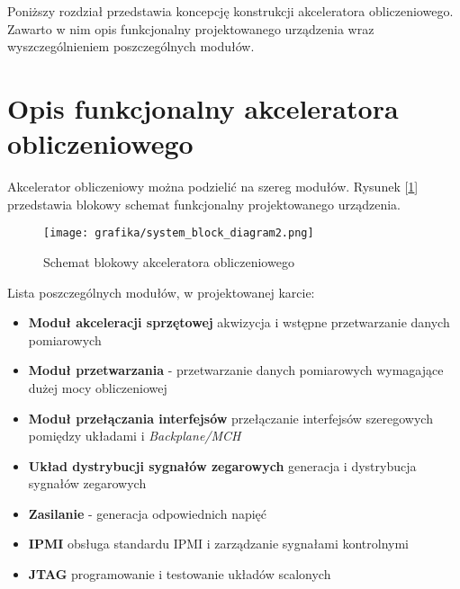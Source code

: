 
Poniższy rozdział przedstawia koncepcję konstrukcji akceleratora obliczeniowego. Zawarto w nim opis funkcjonalny projektowanego urządzenia wraz wyszczególnieniem poszczególnych modułów.  

\section{Opis funkcjonalny akceleratora obliczeniowego}

Akcelerator obliczeniowy można podzielić na szereg modułów. Rysunek [\ref{BLOCK_SYSTEM}] przedstawia blokowy schemat funkcjonalny projektowanego urządzenia. 

\begin{figure}[!ht]
\begin{center}
\texttt{[image: grafika/system\_block\_diagram2.png]}
\end{center}
\caption{Schemat blokowy akceleratora obliczeniowego}
\label{BLOCK_SYSTEM}
\end{figure}

Lista poszczególnych modułów, w projektowanej karcie:
\begin{itemize}
\item \textbf{Moduł akceleracji sprzętowej} akwizycja i wstępne przetwarzanie danych pomiarowych
\item \textbf{Moduł przetwarzania} - przetwarzanie danych pomiarowych wymagające dużej mocy obliczeniowej
\item \textbf{Moduł przełączania interfejsów} przełączanie interfejsów szeregowych pomiędzy układami i \textit{Backplane/MCH}
\item \textbf{Układ dystrybucji sygnałów zegarowych} generacja i dystrybucja sygnałów zegarowych 
\item \textbf{Zasilanie} - generacja odpowiednich napięć
\item \textbf{IPMI} obsługa standardu IPMI i zarządzanie sygnałami kontrolnymi
\item \textbf{JTAG} programowanie i testowanie układów scalonych
\end{itemize} 



